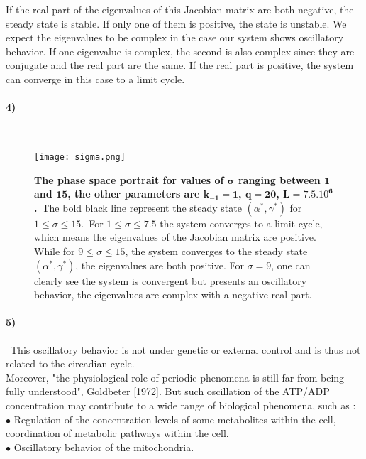 \documentclass{article}
\begin{document}
If the real part of the eigenvalues of this Jacobian matrix are both negative, the steady state is stable. 
If only one of them is positive, the state is unstable. We expect the eigenvalues to be complex in the case our system shows oscillatory behavior.
If one eigenvalue is complex, the second is also complex since they are conjugate and the real part are the same. If the real part is positive, the system can converge in this case to a limit cycle. 

\paragraph{4)}
\


\begin{figure}[H]
	  \centering
  	\texttt{[image: sigma.png]}
  	\caption{\textbf{The phase space portrait for values of $\pmb{\sigma}$ ranging between $\pmb{1}$ and $\pmb{15}$, the other parameters are $\pmb{k_{-1}=1}$, $\pmb{q=20}$, $\pmb{L=7.5.10^6}$.}\ The bold black line represent the steady state $(\alpha^*,\gamma^*)$ for $1\leq\sigma\leq15$.\ For $1\leq\sigma \leq 7.5$ the system converges to a limit cycle, which means the eigenvalues of the Jacobian matrix are positive. While for $9\leq\sigma\leq15$, the system converges to the steady state $(\alpha^*,\gamma^*)$, the eigenvalues are both positive. For $\sigma=9$, one can clearly see the system is convergent but presents an oscillatory behavior, the eigenvalues are complex with a negative real part.}
	\end{figure}
	
\paragraph{5)}
\
This oscillatory behavior is not under genetic or external control and is thus not related to the circadian cycle. \\ 

Moreover, "the physiological role of periodic phenomena is still far from being fully understood", Goldbeter [1972]. But such oscillation of the ATP/ADP concentration may contribute to a wide range of biological phenomena, such as :\\


$\bullet$ Regulation of the concentration levels of some metabolites within the cell, coordination of metabolic pathways within the cell.\\

$\bullet$ Oscillatory behavior of the mitochondria.\\
\end{document}
